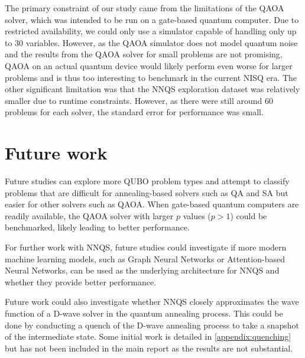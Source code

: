 The primary constraint of our study came from the limitations of the QAOA solver, which was intended to be run on a gate-based quantum computer. Due to restricted availability, we could only use a simulator capable of handling only up to $30$ variables. However, as the QAOA simulator does not model quantum noise and the results from the QAOA solver for small problems are not promising, QAOA on an actual quantum device would likely perform even worse for larger problems and is thus too interesting to benchmark in the current NISQ era. The other significant limitation was that the NNQS exploration dataset was relatively smaller due to runtime constraints. However, as there were still around $60$ problems for each solver, the standard error for performance was small.

\section{Future work}
Future studies can explore more QUBO problem types and attempt to classify problems that are difficult for annealing-based solvers such as QA and SA but easier for other solvers such as QAOA. When gate-based quantum computers are readily available, the QAOA solver with larger $p$ values ($p > 1$) could be benchmarked, likely leading to better performance.

For further work with NNQS, future studies could investigate if more modern machine learning models, such as Graph Neural Networks or Attention-based Neural Networks, can be used as the underlying architecture for NNQS and whether they provide better performance.

Future work could also investigate whether NNQS closely approximates the wave function of a D-wave solver in the quantum annealing process. This could be done by conducting a quench of the D-wave annealing process to take a snapshot of the intermediate state. Some initial work is detailed in \autoref{appendix:quenching} but has not been included in the main report as the results are not substantial.